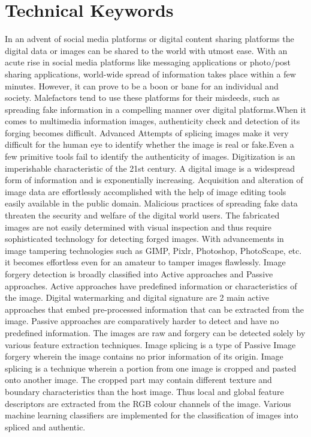\chapter{Technical Keywords}
In an advent of social media platforms or digital content sharing platforms the digital data or images can be shared to the world with utmost ease. With an acute rise in social media platforms like messaging applications or photo/post sharing applications, world-wide spread of   information takes place within a few minutes. However, it can prove to be a boon or bane for an individual and society. Malefactors tend to use these platforms for their misdeeds, such as spreading fake information in a compelling manner over digital platforms.When it comes to multimedia information images, authenticity check and detection of its forging becomes diﬃcult. Advanced Attempts of splicing images make it very diﬃcult for the human eye to identify whether the image is real or fake.Even a few primitive tools fail to identify the authenticity of images. Digitization is an imperishable characteristic of the 21st century. A digital image is a widespread form of information and is exponentially increasing. Acquisition and alteration of image data are eﬀortlessly accomplished with the help of image editing tools easily available in the public domain. Malicious practices of spreading fake data threaten the security and welfare of the digital world users. The fabricated images are not easily determined with visual inspection and thus require sophisticated technology for detecting forged images. With advancements in image tampering technologies such as GIMP, Pixlr, Photoshop, PhotoScape, etc. it becomes eﬀortless even for an amateur to tamper images ﬂawlessly. Image forgery detection is broadly classiﬁed into Active approaches and Passive approaches. Active approaches have predeﬁned information or characteristics of the image. Digital watermarking and digital signature are 2 main active approaches that embed pre-processed information that can be extracted from the image. Passive approaches are comparatively harder to detect and have no predeﬁned information. The images are raw and forgery can be detected solely by various feature extraction techniques. Image splicing is a type of Passive Image forgery wherein the image contains no prior information of its origin. Image splicing is a technique wherein a portion from one image is cropped and pasted onto another image. The cropped part may contain diﬀerent texture and boundary characteristics than the host image. Thus local and global feature descriptors are extracted from the RGB colour channels of the image. Various machine learning classiﬁers are implemented for the classiﬁcation of images into spliced and authentic.

